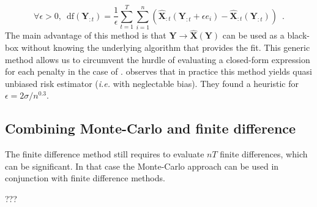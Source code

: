 \documentclass[a4paper,10pt]{article}
\theoremstyle{definition}
\begin{document}
\begin{equation*}
    \forall \epsilon > 0, \enspace \text{df}(\mathbf{Y}_{:t}) = \frac{1}{\epsilon} \sum_{t=1}^T \sum_{i=1}^n
    \left( \mathbf{\hat{X}}_{:t}(\mathbf{Y}_{:t} + \epsilon e_i) - \mathbf{\hat{X}}_{:t}(\mathbf{Y}_{:t}) \right)
    \enspace .
\end{equation*}
%
The main advantage of this method is that $\mathbf{Y} \rightarrow \mathbf{\hat{X}(Y)}$ can be used as a black-box without knowing the underlying algorithm that provides
the fit. This generic method allows us to circumvent the hurdle of evaluating a closed-form expression for each penalty in the case of .
\cite{Deledalle_Vaiter_Fadili_Peyre14} observes that in practice this method yields quasi unbiased risk estimator (\textit{i.e.} with neglectable bias). They
found a heuristic for $\epsilon = 2 \sigma / n^{0.3}$.

\subsection{Combining Monte-Carlo and finite difference}

The finite difference method still requires to evaluate $nT$ finite differences, which can be significant. In that case the
Monte-Carlo approach can be used in conjunction with finite difference methods.

???

\newpage


\end{document}
